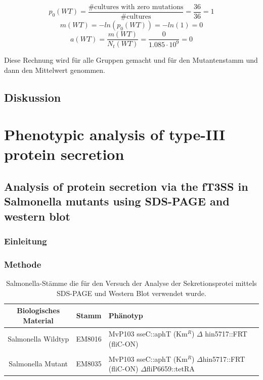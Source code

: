 \documentclass[oneside,10pt,a4paper]{report}
\begin{document}
		\begin{equation}\nonumber
			p_0 (WT)= \frac{\# \text{cultures with zero mutations}}{\#\text{cultures}} = \frac{36}{36} = 1
		\end{equation}
		\begin{equation}\nonumber
			m(WT) = -ln(p_0(WT)) = -ln(1) = 0
		\end{equation}
		\begin{equation}\nonumber
			a(WT) = \frac{m(WT)}{N_t(WT)} = \frac{0}{1.085 \cdot 10^9} = 0
		\end{equation}
		
		Diese Rechnung wird für alle Gruppen gemacht und für den Mutantenstamm und dann den Mittelwert genommen.
		
		\section{Diskussion}
	
	\chapter{Phenotypic analysis of type-III protein secretion}
	
		\section{Analysis of protein secretion via the fT3SS in Salmonella mutants using SDS-PAGE and western blot}
	
		\subsection{Einleitung}
		
		\subsection{Methode}
			\begin{table}[H]
				\centering
				\caption{Salmonella-Stämme die für den Versuch der Analyse der Sekretionsprotei mittels SDS-PAGE und Western Blot verwendet wurde.}
				\label{tab: exp6-biologisches Material part1}
				\begin{tabular}{ccp{7.5cm}}
					\toprule
					Biologisches Material& Stamm & Phänotyp\\
					\midrule
					\multirow{2}{*}{\parbox[t]{2cm}{Salmonella Wildtyp}}  & \multirow{2}{*}{EM8016} & \multirow{2}{*}{\parbox[t]{7.5cm}{MvP103 sseC::aphT (Km$^R$) $\Delta$ hin5717::FRT (fliC-ON)}}\\
					&&\\
					&&\\
					\multirow{3}{*}{\parbox[t]{2cm}{Salmonella Mutant}} & \multirow{3}{*}{EM8035} &\multirow{3}{*}{\parbox[t]{7.5cm}{MvP103 sseC::aphT (Km$^R$) $\Delta$hin5717::FRT (fliC-ON) $\Delta$fliP6659::tetRA}} \\
					&&\\
					&&\\
					
					\bottomrule			
				\end{tabular}
			\end{table}
			
\end{document}
